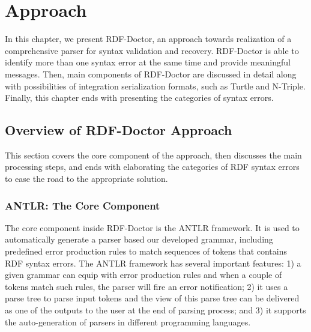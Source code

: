 \chapter{Approach}
\label{ch:approach}
In this chapter, we present RDF-Doctor, an approach towards realization of a comprehensive parser for syntax validation and recovery.
RDF-Doctor is able to identify more than one syntax error at the same time and provide meaningful messages.
Then, main components of RDF-Doctor are discussed in detail along with possibilities of integration serialization formats, such as Turtle and N-Triple. Finally, this chapter ends with presenting the categories of syntax errors.


\section{Overview of RDF-Doctor Approach}

This section covers the core component of the approach, then discusses the main processing steps, and ends with elaborating the categories of RDF syntax errors to ease the road to the appropriate solution. 

\subsection{ANTLR: The Core Component}

The core component inside RDF-Doctor is the ANTLR framework. It is used to automatically generate a parser based our developed grammar, including predefined error production rules to match sequences of tokens that contains RDF syntax errors.
The ANTLR framework has several important features: 1) a given grammar can equip with error production rules and when a couple of tokens match such rules, the parser will fire an error notification; 2) it uses a parse tree to parse input tokens and the view of this parse tree can be delivered as one of the outputs to the user at the end of parsing process; and 3) it supports the auto-generation of parsers in different programming languages.

